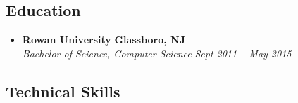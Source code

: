 \begin{itemize}
\begin{comment} %
  \item
  \headerrow
    {\textbf{Rowan University}}
    {\textbf{Glassboro, NJ}}
  \\
  \headerrow
    {\emph{Web Developer, History Department}}
    {\emph{Nov 2013 -- May 2015}}
  \begin{itemize*}
    \item Updated and maintained the History Department's website
  \end{itemize*}
  \headerrow
    {\emph{Network Assistant, Network \& System Services}}
    {\emph{Jul 2014 -- Sept 2014}}
  \begin{itemize*}
    \item Installed and maintained network infrastructure across the Glassboro campus
  \end{itemize*}
\end{comment}

\end{itemize}

\subsection*{Education}

\begin{itemize}
  \parskip=0.1em

  \item
  \headerrow
    {\textbf{Rowan University}}
    {\textbf{Glassboro, NJ}}
  \\
  \headerrow
    {\emph{Bachelor of Science, Computer Science}}
    {\emph{Sept 2011 -- May 2015}}

\end{itemize}

\subsection*{Technical Skills}

